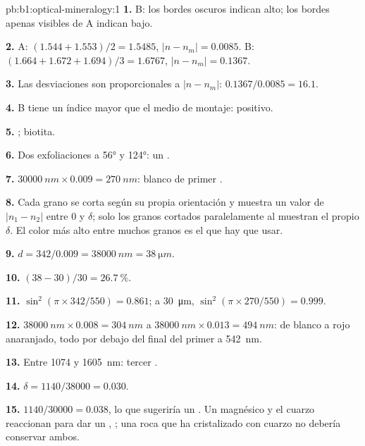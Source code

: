 \begin{solution}{pb:b1:optical-mineralogy:1}
\textbf{1.} B: los bordes oscuros indican  alto; los bordes apenas visibles de A indican  bajo.

\textbf{2.} A: $(1.544 + 1.553)/2 = 1.5485$, $|n - n_m| = 0.0085$. B:
$(1.664 + 1.672 + 1.694)/3 = 1.6767$, $|n - n_m| = 0.1367$.

\textbf{3.} Las desviaciones son proporcionales a $|n - n_m|$: $0.1367/0.0085 =
16.1$.

\textbf{4.} B tiene un índice mayor que el medio de montaje:  positivo.

\textbf{5.} ; biotita.

\textbf{6.} Dos exfoliaciones a \ang{56} y \ang{124}: un .

\textbf{7.} $\qty{30000}{nm}\times0.009 = \qty{270}{nm}$: blanco de primer .

\textbf{8.} Cada grano se corta según su propia orientación y muestra un valor de $|n_1 - n_2|$ entre 0 y $\delta$;
solo los granos cortados paralelamente al  muestran el propio $\delta$. El color más alto entre muchos granos
es el que hay que usar.

\textbf{9.} $d = 342/0.009 = \qty{38000}{nm} = \qty{38}{\micro m}$.

\textbf{10.} $(38 - 30)/30 = \qty{26.7}{\percent}$.

\textbf{11.} $\sin^2(\pi\times342/550) = 0.861$; a \qty{30}{\micro m},
$\sin^2(\pi\times270/550) = 0.999$.

\textbf{12.} $\qty{38000}{nm}\times0.008 = \qty{304}{nm}$ a
$\qty{38000}{nm}\times0.013 = \qty{494}{nm}$: de blanco a rojo anaranjado, todo por debajo del final del primer  a
\qty{542}{nm}.

\textbf{13.} Entre 1074 y \qty{1605}{nm}: tercer .

\textbf{14.} $\delta = 1140/38000 = 0.030$.

\textbf{15.} $1140/30000 = 0.038$, lo que sugeriría un . Un  magnésico y el cuarzo reaccionan para dar un
, ; una roca que ha cristalizado con cuarzo no debería conservar ambos.


\end{solution}

